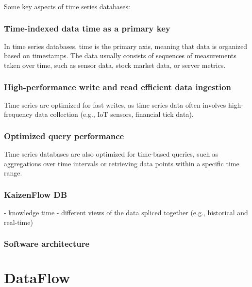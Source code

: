 \documentclass[11pt, reqno]{amsart}
\theoremstyle{definition}
\theoremstyle{remark}
\begin{document}
Some key aspects of time series databases:

\subsubsection{Time-indexed data time as a primary key} In time series
databases, time is the primary axis, meaning that data is organized based
on timestamps. The data usually consists of sequences of measurements taken
over time, such as sensor data, stock market data, or server metrics.

\subsubsection{High-performance write and read efficient data ingestion}
Time series are optimized for fast writes, as time series data often involves
high-frequency data collection (e.g., IoT sensors, financial tick data).

\subsubsection{Optimized query performance}
Time series databases are also optimized for time-based queries, such as
aggregations over time intervals or retrieving data points within a specific
time range.

\subsubsection{KaizenFlow DB}

- knowledge time
- different views of the data spliced together (e.g., historical and real-time)


\subsubsection{Software architecture}


\section{DataFlow}
\end{document}
